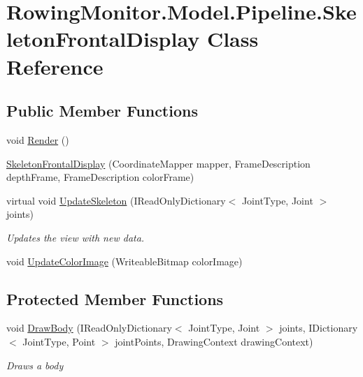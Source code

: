 \hypertarget{class_rowing_monitor_1_1_model_1_1_pipeline_1_1_skeleton_frontal_display}{}\section{Rowing\+Monitor.\+Model.\+Pipeline.\+Skeleton\+Frontal\+Display Class Reference}
\label{class_rowing_monitor_1_1_model_1_1_pipeline_1_1_skeleton_frontal_display}
\subsection*{Public Member Functions}
\begin{DoxyCompactItemize}
\item 
void \hyperlink{class_rowing_monitor_1_1_model_1_1_pipeline_1_1_skeleton_frontal_display_ae55122ec00fa8ea4a95037c3cb4d8580}{Render} ()
\item 
\hyperlink{class_rowing_monitor_1_1_model_1_1_pipeline_1_1_skeleton_frontal_display_a74506876336e434a4ed20c3e0d7fd86e}{Skeleton\+Frontal\+Display} (Coordinate\+Mapper mapper, Frame\+Description depth\+Frame, Frame\+Description color\+Frame)
\item 
virtual void \hyperlink{class_rowing_monitor_1_1_model_1_1_pipeline_1_1_skeleton_frontal_display_a698babc7b0ee287fd25de6e784b242ab}{Update\+Skeleton} (I\+Read\+Only\+Dictionary$<$ Joint\+Type, Joint $>$ joints)
\begin{DoxyCompactList}\small\item\em Updates the view with new data. \end{DoxyCompactList}\item 
void \hyperlink{class_rowing_monitor_1_1_model_1_1_pipeline_1_1_skeleton_frontal_display_af4c354d73bb82b2bb35a8eefe1dd3851}{Update\+Color\+Image} (Writeable\+Bitmap color\+Image)
\end{DoxyCompactItemize}
\subsection*{Protected Member Functions}
\begin{DoxyCompactItemize}
\item 
void \hyperlink{class_rowing_monitor_1_1_model_1_1_pipeline_1_1_skeleton_frontal_display_a4f24762b003e94837e955d31f81c0499}{Draw\+Body} (I\+Read\+Only\+Dictionary$<$ Joint\+Type, Joint $>$ joints, I\+Dictionary$<$ Joint\+Type, Point $>$ joint\+Points, Drawing\+Context drawing\+Context)
\begin{DoxyCompactList}\small\item\em Draws a body \end{DoxyCompactList}\end{DoxyCompactItemize}
